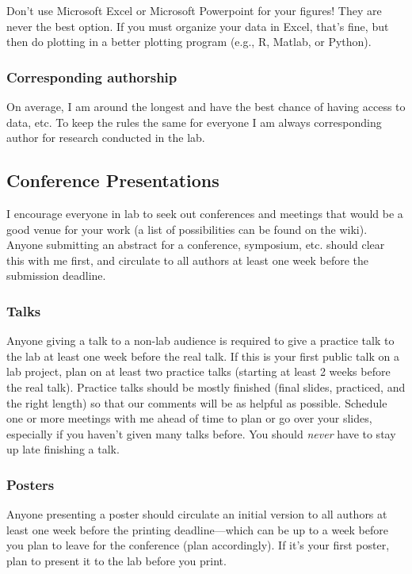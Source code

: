 \documentclass[letterpaper,11pt,oneside]{memoir}
\begin{document}
\begin{shaded}
\noindent Don't use Microsoft Excel or Microsoft Powerpoint for your figures! They are never the best option. If you must organize your data in Excel, that's fine, but then do plotting in a better plotting program (e.g., R, Matlab, or Python).
\end{shaded}


\subsubsection{Corresponding authorship}
On average, I am around the longest and have the best chance of having access to data, etc. To keep the rules the same for everyone I am always corresponding author for research conducted in the lab.



\subsection{Conference Presentations}
I encourage everyone in lab to seek out conferences and meetings that would be a good venue for your work (a list of possibilities can be found on the wiki). Anyone submitting an abstract for a conference, symposium, etc. should clear this with me first, and circulate to all authors at least one week before the submission deadline.

\subsubsection{Talks}
Anyone giving a talk to a non-lab audience is required to give a practice talk to the lab at least one week before the real talk. If this is your first public talk on a lab project, plan on at least two practice talks (starting at least 2 weeks before the real talk). Practice talks should be mostly finished (final slides, practiced, and the right length) so that our comments will be as helpful as possible. Schedule one or more meetings with me ahead of time to plan or go over your slides, especially if you haven't given many talks before. You should \textit{never} have to stay up late finishing a talk.

\subsubsection{Posters}
Anyone presenting a poster should circulate an initial version to all authors at least one week before the printing deadline---which can be up to a week before you plan to leave for the conference (plan accordingly). If it's your first poster, plan to present it to the lab before you print. 
\end{document}
